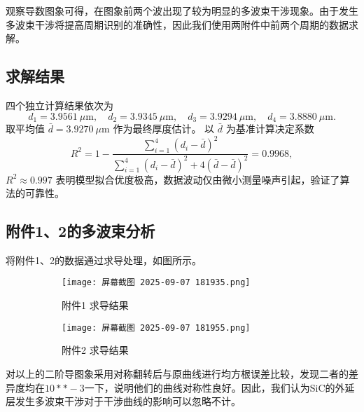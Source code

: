\documentclass[withoutpreface,bwprint]{cumcmthesis}
\begin{document}
观察导数图象可得，在图象前两个波出现了较为明显的多波束干涉现象。由于发生多波束干涉将提高周期识别的准确性，因此我们使用两附件中前两个周期的数据求解。
\subsection{求解结果}
四个独立计算结果依次为
\[
d_1 = 3.9561\ \mu\text{m},\quad
d_2 = 3.9345\ \mu\text{m},\quad
d_3 = 3.9294\ \mu\text{m},\quad
d_4 = 3.8880\ \mu\text{m}.
\]
取平均值 $\bar{d}=3.9270\ \mu\text{m}$ 作为最终厚度估计。
以 $\bar{d}$ 为基准计算决定系数
\[
R^2 = 1-\frac{\sum_{i=1}^{4}(d_i-\bar{d})^2}
               {\sum_{i=1}^{4}(d_i-\bar{d})^2 + 4(\bar{d}-\bar{d})^2}
        = 0.9968,
\]
$R^2\approx0.997$ 表明模型拟合优度极高，数据波动仅由微小测量噪声引起，验证了算法的可靠性。
\subsection{附件1、2的多波束分析}
将附件1、2的数据通过求导处理，如图所示。

\begin{figure}[H]
  \centering
  \begin{subfigure}[b]{0.8\linewidth}
    \texttt{[image: 屏幕截图 2025-09-07 181935.png]}
    \caption{附件1 求导结果}
    \label{fig:附件53 求导结果}
  \end{subfigure}
  \hfill
  \begin{subfigure}[b]{0.8\linewidth}
    \texttt{[image: 屏幕截图 2025-09-07 181955.png]}
    \caption{附件2 求导结果}

    \label{fig:mao5sgniow}
  \end{subfigure}
  \caption{}
  \label{fig:double55}
\end{figure}
对以上的二阶导图象采用对称翻转后与原曲线进行均方根误差比较，发现二者的差异度均在$10**-3$一下，说明他们的曲线对称性良好。因此，我们认为SiC的外延层发生多波束干涉对于干涉曲线的影响可以忽略不计。


\end{document}
